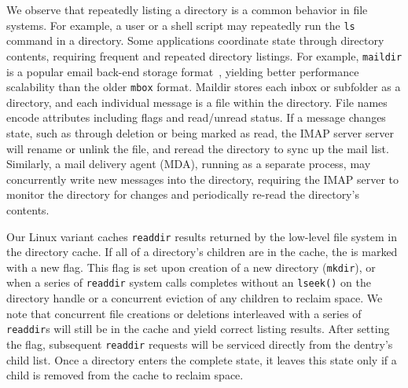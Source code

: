 We observe that repeatedly listing a directory is a common behavior
in file systems.
For example,
a user or a shell script may repeatedly run the {\tt ls} command
in a directory.
Some applications coordinate state through directory contents,
requiring frequent and repeated directory listings.
For example, {\tt maildir} is a popular email back-end storage format~\cite{maildir},
yielding better performance scalability than the older {\tt mbox} format.
Maildir stores each inbox or subfolder as a directory,
and each individual message is a file within the directory.
File names encode attributes including  flags and read/unread status.
If a message changes state, such as through deletion or being marked as read,
the IMAP server server will rename or unlink the file, and reread the directory to
sync up the mail list. 
Similarly, a mail delivery agent (MDA), running as a separate process, 
may concurrently write new messages into the directory, requiring the IMAP server
to monitor the directory for changes and  periodically re-read the directory's contents.


Our Linux variant caches {\tt readdir} results returned by the low-level file system
in the directory cache.
If all of a directory's children are in the cache,
the \dentry{} is marked with a new \completeflag{} flag.
This flag is set upon creation of a new directory ({\tt mkdir}),
or when a series of {\tt readdir} system calls completes without  an {\tt lseek()} on the directory handle
or a concurrent eviction of any children to reclaim space.
We note that concurrent file creations or deletions interleaved  with a series of {\tt readdir}s
will still be in the cache and yield correct listing results.
After setting the \completeflag{} flag, subsequent {\tt readdir} requests
will be serviced directly from the dentry's child list.
Once a directory enters the complete state, it leaves this state only 
if a child \dentry{} is removed from the cache to reclaim space.

